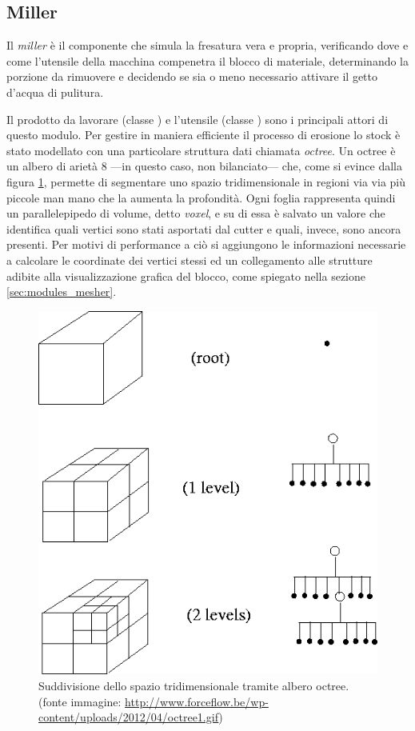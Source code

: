 \subsection{Miller}
Il \emph{miller} è il componente che simula la fresatura vera e propria, verificando dove e come l'utensile della macchina compenetra il blocco di materiale, determinando la porzione da rimuovere e decidendo se sia o meno necessario attivare il getto d'acqua di pulitura.

Il prodotto da lavorare (classe ) e l'utensile (classe ) sono i principali attori di questo modulo. Per gestire in maniera efficiente il processo di erosione lo stock è stato modellato con una particolare struttura dati chiamata \emph{octree}. Un octree è un albero di arietà 8 ---in questo caso, non bilanciato--- che, come si evince dalla figura \ref{fig:octree_explanation}, permette di segmentare uno spazio tridimensionale in regioni via via più piccole man mano che la aumenta la profondità. Ogni foglia rappresenta quindi un parallelepipedo di volume, detto \emph{voxel}, e su di essa è salvato un valore che identifica quali vertici sono stati asportati dal cutter e quali, invece, sono ancora presenti. Per motivi di performance a ciò si aggiungono le informazioni necessarie a calcolare le coordinate dei vertici stessi ed un collegamento alle strutture adibite alla visualizzazione grafica del blocco, come spiegato nella sezione \ref{sec:modules_mesher}.
\begin{figure}[htp]
	\centering
	\includegraphics[width=.75\textwidth]{img/octree_explanation}
	\caption{Suddivisione dello spazio tridimensionale tramite albero octree. {\footnotesize (fonte immagine: \url{http://www.forceflow.be/wp-content/uploads/2012/04/octree1.gif})}}
	\label{fig:octree_explanation}
\end{figure}

